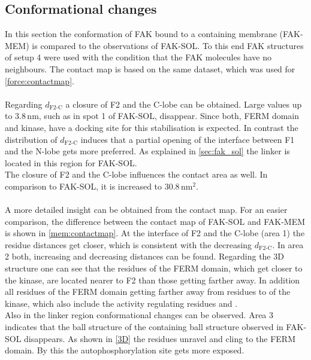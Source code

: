 \subsection{Conformational changes}
In this section the conformation of FAK bound to a \pip{} containing membrane (FAK-MEM) is compared to the observations of FAK-SOL. To this end FAK structures of setup 4 were used with the condition that the FAK molecules have no neighbours. The contact map is based on the same dataset, which was used for \autoref{force:contactmap}.\\
\\
Regarding $d_\text{F2-C}$ a closure of F2 and the C-lobe can be obtained. Large values up to $3.8\,\si{\nano\metre}$, such as in spot 1 of FAK-SOL, disappear. Since both, FERM domain and kinase, have a docking site for \pip{} this stabilisation is expected. In contrast the distribution of $d_\text{F2-C}$ induces that a partial opening of the interface between F1 and the N-lobe gets more preferred. As explained in \autoref{sec:fak_sol} the linker is located in this region for FAK-SOL.\\
The closure of F2 and the C-lobe influences the contact area as well. In comparison to FAK-SOL, it is increased to $30.8\,\si{\nano\metre}^2$.\\
\\
A more detailed insight can be obtained from the contact map. For an easier comparison, the difference between the contact map of FAK-SOL and FAK-MEM is shown in \autoref{mem:contactmap}. At the interface of F2 and the C-lobe (area 1) the residue distances get closer, which is consistent with the decreasing $d_\text{F2-C}$. In area 2 both, increasing and decreasing distances can be found. Regarding the 3D structure one can see that the residues of the FERM domain, which get closer to the kinase, are located nearer to F2 than those getting farther away. In addition all residues of the FERM domain getting farther away from residues  to  of the kinase, which also include the activity regulating residues  and .\\
Also in the linker region conformational changes can be observed. Area 3 indicates that the ball structure of the  containing ball structure observed in FAK-SOL disappears. As shown in \autoref{3D} the residues unravel and cling to the FERM domain. By this the autophosphorylation site  gets more exposed.\\
\\
